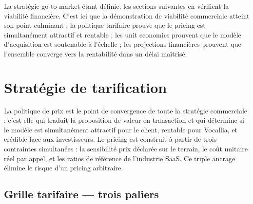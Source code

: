 \medskip
La stratégie go-to-market étant définie, les sections suivantes en vérifient la viabilité financière. C'est ici que la démonstration de viabilité commerciale atteint son point culminant : la politique tarifaire prouve que le pricing est simultanément attractif et rentable ; les unit economics prouvent que le modèle d'acquisition est soutenable à l'échelle ; les projections financières prouvent que l'ensemble converge vers la rentabilité dans un délai maîtrisé.

\section{Stratégie de tarification}
\label{section3.8}

La politique de prix est le point de convergence de toute la stratégie commerciale : c'est elle qui traduit la proposition de valeur en transaction et qui détermine si le modèle est simultanément attractif pour le client, rentable pour Vocallia, et crédible face aux investisseurs. Le pricing est construit à partir de trois contraintes simultanées : la sensibilité prix déclarée sur le terrain, le coût unitaire réel par appel, et les ratios de référence de l'industrie SaaS. Ce triple ancrage élimine le risque d'un pricing arbitraire.

\subsection{Grille tarifaire --- trois paliers}
\label{section3.8.1}

